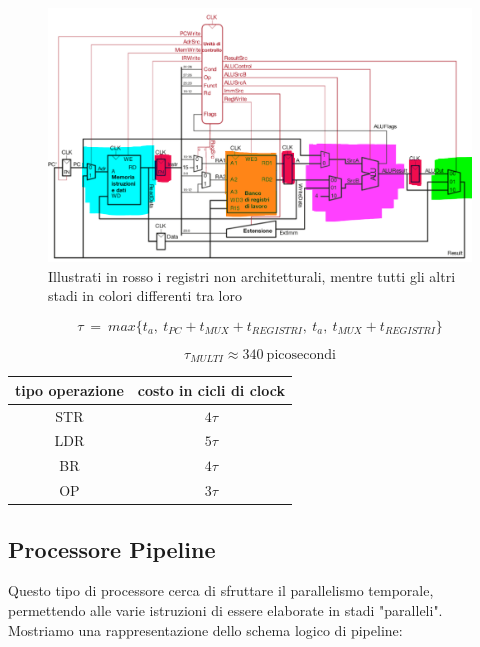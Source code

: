 \documentclass{article}
\begin{document}
\begin{figure}[htbp]
        \center
        \includegraphics[scale=0.45]{img/implementazione_multi_cycle.png}
        \caption{Illustrati in rosso i registri non architetturali, mentre tutti gli altri stadi in colori differenti tra loro}
    \end{figure}

\vspace*{5px}

\[ \tau \: = \: max\{ t_a,\: t_{PC}+t_{MUX}+t_{REGISTRI},\: t_{a},\: t_{MUX}+t_{REGISTRI}  \} \]

\[ \tau_{MULTI} \approx 340 \: \text{picosecondi} \]

\vspace*{20px}

\begin{center}
\begin{tabular}{ |c|c| } %
 \hline
  tipo operazione & costo in cicli di clock \\
  \hline
  STR & $4\tau$ \\
  LDR & $5\tau$ \\
  BR & $4\tau$ \\
  OP & $3\tau$ \\
 \hline
\end{tabular}
\end{center}

\newpage

\subsection{Processore Pipeline}

Questo tipo di processore cerca di sfruttare il parallelismo temporale, permettendo alle varie istruzioni di essere elaborate in stadi "paralleli". Mostriamo una rappresentazione dello schema logico di pipeline:
\end{document}
